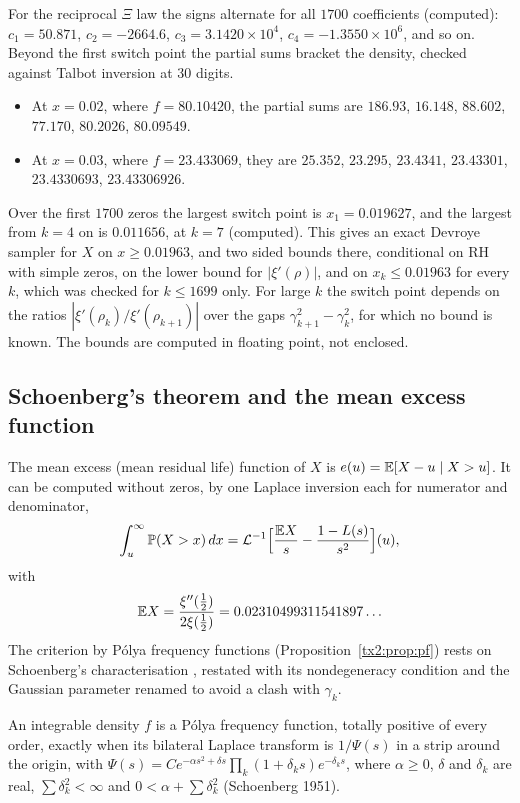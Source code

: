 For the reciprocal $\Xi$ law the signs alternate for all $1700$ coefficients (computed): $c_1=50.871$, $c_2=-2664.6$, $c_3=3.1420\times10^4$, $c_4=-1.3550\times10^6$, and so on. Beyond the first switch point the partial sums bracket the density, checked against Talbot inversion at 30 digits.
\begin{itemize}
\item At $x=0.02$, where $f=80.10420$, the partial sums are $186.93$, $16.148$, $88.602$, $77.170$, $80.2026$, $80.09549$.
\item At $x=0.03$, where $f=23.433069$, they are $25.352$, $23.295$, $23.4341$, $23.43301$, $23.4330693$, $23.43306926$.
\end{itemize}
Over the first $1700$ zeros the largest switch point is $x_1=0.019627$, and the largest from $k=4$ on is $0.011656$, at $k=7$ (computed). This gives an exact Devroye sampler for $X$ on $x\ge0.01963$, and two sided bounds there, conditional on RH with simple zeros, on the lower bound for $|\xi'(\rho)|$, and on $x_k\le0.01963$ for every $k$, which was checked for $k\le1699$ only. For large $k$ the switch point depends on the ratios $|\xi'(\rho_k)/\xi'(\rho_{k+1})|$ over the gaps $\gamma_{k+1}^2-\gamma_k^2$, for which no bound is known. The bounds are computed in floating point, not enclosed.

\subsection{Schoenberg's theorem and the mean excess function}\label{ev:sec:mexcess}

The mean excess (mean residual life) function of $X$ is $e(u)=\mathbb{E}[X-u\mid X>u]$. It can be computed without zeros, by one Laplace inversion each for numerator and denominator,
\[
\int_u^\infty\mathbb{P}(X>x)\,dx=\mathcal L^{-1}\Big[\frac{\mathbb{E} X}{s}-\frac{1-L(s)}{s^2}\Big](u),
\]
with
\[
\mathbb{E} X=\frac{\xi''(\frac12)}{2\xi(\frac12)}=0.02310499311541897\ldots
\]
The criterion by P\'olya frequency functions (Proposition~\ref{tx2:prop:pf}) rests on Schoenberg's characterisation \cite{Schoenberg51}, restated with its nondegeneracy condition and the Gaussian parameter renamed to avoid a clash with $\gamma_k$.

\begin{theorem}[Schoenberg]\label{ev:thm:schoenberg}
An integrable density $f$ is a P\'olya frequency function, totally positive of every order, exactly when its bilateral Laplace transform is $1/\Psi(s)$ in a strip around the origin, with $\Psi(s)=Ce^{-\alpha s^2+\delta s}\prod_k(1+\delta_ks)e^{-\delta_ks}$, where $\alpha\ge0$, $\delta$ and $\delta_k$ are real, $\sum\delta_k^2<\infty$ and $0<\alpha+\sum\delta_k^2$ (Schoenberg 1951).
\end{theorem}

